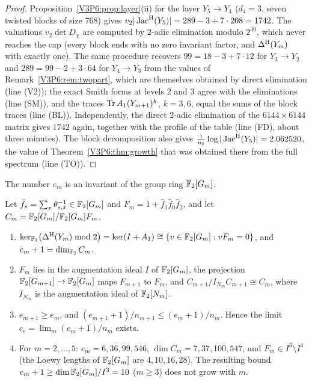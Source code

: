 \begin{proof}
Proposition~\ref{V3P6:prop:layer}(ii) for the layer $Y_5\to Y_4$ ($d_4=3$, seven twisted blocks
of size $768$) gives $v_2|\operatorname{Jac}^{\mathrm{H}}(Y_5)|=289-3+7\cdot208=1742$. The valuations $v_2\det D_\chi$
are computed by $2$-adic elimination modulo $2^{30}$, which never reaches the cap (every block
ends with no zero invariant factor, and $\Delta^{\mathrm{H}}(Y_m)$ with exactly one). The same procedure
recovers $99=18-3+7\cdot12$ for $Y_3\to Y_2$ and $289=99-2+3\cdot64$ for $Y_4\to Y_3$ from the
values of Remark~\ref{V3P6:rem:twopart}, which are themselves obtained by direct elimination
(line (V2)); the exact Smith forms at levels $2$ and $3$ agree with the eliminations (line (SM)),
and the traces $\operatorname{Tr} A_1(Y_{m+1})^{k}$, $k=3,6$, equal the sums of the block traces (line (BL)).
Independently, the direct $2$-adic elimination of the $6144\times6144$ matrix gives $1742$
again, together with the profile of the table (line (FD), about three minutes). The block
decomposition also gives $\frac1{n_5}\log|\operatorname{Jac}^{\mathrm{H}}(Y_5)|=2.062520$, the value of
Theorem~\ref{V3P6:thm:growth} that was obtained there from the full spectrum (line (TO)).
\end{proof}

The number $e_m$ is an invariant of the group ring $\mathbb{F}_2[G_m]$.

\begin{proposition}\label{V3P6:prop:schur}
Let $\bar f_s=\sum_{x}\theta_{s,x}^{-1}\in\mathbb{F}_2[G_m]$ and $F_m=1+\bar f_1\bar f_0\bar f_2$, and
let $C_m=\mathbb{F}_2[G_m]/\mathbb{F}_2[G_m]F_m$.
\begin{enumerate}
\item[(i)] $\ker_{\mathbb{F}_2}\bigl(\Delta^{\mathrm{H}}(Y_m)\bmod2\bigr)=\ker(I+A_1)\cong\{v\in\mathbb{F}_2[G_m]:vF_m=0\}$,
and $e_m+1=\dim_{\mathbb{F}_2}C_m$.
\item[(ii)] $F_m$ lies in the augmentation ideal $I$ of $\mathbb{F}_2[G_m]$, the projection
$\mathbb{F}_2[G_{m+1}]\to\mathbb{F}_2[G_m]$ maps $F_{m+1}$ to $F_m$, and
$C_{m+1}/I_{N_m}C_{m+1}\cong C_m$, where $I_{N_m}$ is the augmentation ideal of $\mathbb{F}_2[N_m]$.
\item[(iii)] $e_{m+1}\ge e_m$, and $(e_{m+1}+1)/n_{m+1}\le(e_m+1)/n_m$. Hence the limit
$c_e=\lim_m(e_m+1)/n_m$ exists.
\item[(iv)] For $m=2,\dots,5$: $e_m=6,36,99,546$, $\dim C_m=7,37,100,547$, and
$F_m\in I^{3}\setminus I^{4}$ (the Loewy lengths of $\mathbb{F}_2[G_m]$ are $4,10,16,28$). The resulting
bound $e_m+1\ge\dim\mathbb{F}_2[G_m]/I^{3}=10$ ($m\ge3$) does not grow with $m$.
\end{enumerate}
\end{proposition}

